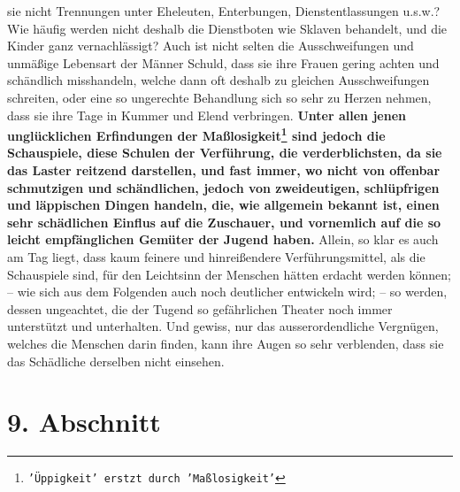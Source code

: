 sie nicht Trennungen unter Eheleuten, Enterbungen, Dienstentlassungen u.s.w.?
Wie häufig werden nicht deshalb die Dienstboten
wie 
Sklaven behandelt, und die
Kinder ganz vernachlässigt? Auch ist nicht selten die
Ausschweifungen und
unmäßige Lebensart der Männer Schuld,
dass sie ihre Frauen gering achten und
schändlich misshandeln, welche dann oft deshalb zu gleichen Ausschweifungen
schreiten, oder eine so ungerechte Behandlung sich so sehr zu Herzen nehmen,
dass
sie ihre Tage in Kummer und Elend verbringen.
\label{ref:15_08_schauspiel}
\textbf{Unter allen jenen unglücklichen
Erfindungen der Maßlosigkeit\footnote{\texttt{'Üppigkeit' erstzt durch
'Maßlosigkeit'}} 
sind jedoch die Schauspiele, diese Schulen der
Verführung, die verderblichsten, da sie das Laster reitzend darstellen, und fast
immer, wo nicht von offenbar schmutzigen und schändlichen, jedoch von
zweideutigen, schlüpfrigen und läppischen Dingen handeln, die, wie allgemein
bekannt ist, einen sehr schädlichen Einflus auf die Zuschauer, und vornemlich
auf die so leicht empfänglichen Gemüter der Jugend haben.} Allein, so klar es
auch am Tag liegt, dass kaum feinere und hinreißendere Verführungsmittel, als
die Schauspiele sind, für den Leichtsinn der Menschen hätten erdacht werden
können; -- wie sich aus dem Folgenden auch noch deutlicher entwickeln wird; --
so werden, dessen ungeachtet, die der Tugend so gefährlichen Theater noch immer
unterstützt und unterhalten. Und gewiss, nur das ausserordendliche Vergnügen,
welches die Menschen darin finden, kann ihre Augen so sehr verblenden, dass sie
das Schädliche derselben nicht einsehen.

\section{9. Abschnitt} \label{kap15_ab9}

